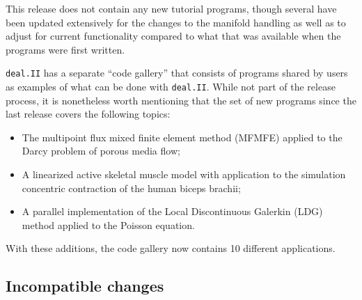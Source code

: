 \documentclass{ansarticle-preprint}
\newcommand{\specialword}[1]{\texttt{#1}}
\newcommand{\dealii}{{\specialword{deal.II}}}
\begin{document}
This release does not contain any new tutorial programs, though
several have been updated extensively for the changes to the manifold
handling as well as to adjust for current functionality
compared to what that was available when the programs were first written.

\dealii{} has a separate ``code gallery'' that
consists of programs shared by users as examples of what can be
done with \dealii{}. While not part of the release process, it is nonetheless
worth mentioning that the set of new programs since the last release covers
the following topics:
\begin{itemize}
\item The multipoint flux mixed finite element method (MFMFE) applied
  to the Darcy problem of porous media flow;
\item A linearized active skeletal muscle model with application to
  the simulation concentric contraction of the human biceps brachii;
\item A parallel implementation of the Local Discontinuous Galerkin
  (LDG) method applied to the Poisson equation.
\end{itemize}
With these additions, the code gallery now contains 10 different applications.


\subsection{Incompatible changes}
\end{document}
